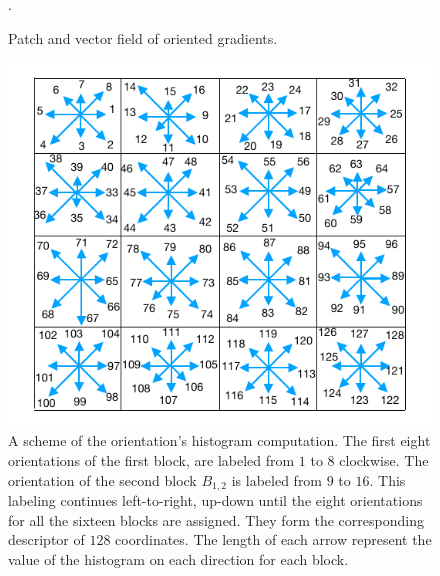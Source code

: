 \begin{figure}[h!]
\caption[Histogram of Gradient Orientations]{Patch and vector field of oriented gradients.}.
\label{fig:sampledescriptor}
\end{figure}


\begin{figure}[h!]
\centering
\includegraphics[width=16cm]{images/gradientorientations.pdf}
\caption[Gradient Orientations Numbering]{A scheme of the orientation's histogram computation. The first eight orientations of the first block, are labeled from $1$ to $8$ clockwise. The orientation of the second block $ B_{1,2} $ is labeled from $9$ to $16$.  This labeling continues left-to-right, up-down until the eight orientations for all the sixteen blocks are assigned. They form the corresponding descriptor of $128$ coordinates.  The length of each arrow represent the value of the histogram on each direction for each block.}
\label{fig:orientationsfull}
\end{figure}


